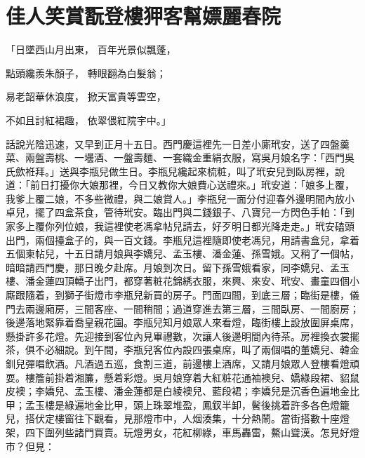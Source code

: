 %

\chapter{佳人笑賞翫登樓\KG 狎客幫嫖麗春院}

「日墜西山月出東，  百年光景似飄蓬，

點頭纔羨朱顏子，  轉眼翻為白髮翁；

易老韶華休浪度，  掀天富貴等雲空，

不如且討紅裙趣，  依翠偎紅院宇中。」

話說光陰迅速，又早到正月十五日。西門慶這裡先一日差小廝玳安，送了四盤羹菜、兩盤壽桃、一壜酒、一盤壽麵、一套織金重絹衣服，寫吳月娘名字：「西門吳氏歛袵拜。」送與李瓶兒做生日。李瓶兒纔起來梳粧，叫了玳安兒到臥房裡，說道：「前日打擾你大娘那裡，今日又教你大娘費心送禮來。」玳安道：「娘多上覆，我爹上覆二娘，不多些微禮，與二娘賞人。」李瓶兒一面分付迎春外邊明間內放小卓兒，擺了四盒茶食，管待玳安。臨出門與二錢銀子、八寶兒一方閃色手帕：「到家多上覆你列位娘，我這裡使老馮拿帖兒請去，好歹明日都光降走走。」玳安磕頭出門，兩個擡盒子的，與一百文錢。李瓶兒這裡隨即使老馮兒，用請書盒兒，拿着五個柬帖兒，十五日請月娘與李嬌兒、孟玉樓、潘金蓮、孫雪娥。又稍了一個帖，暗暗請西門慶，那日晚夕赴席。月娘到次日。留下孫雪娥看家，同李嬌兒、孟玉樓、潘金蓮四頂轎子出門，都穿著粧花錦綉衣服，來興、來安、玳安、畫童四個小廝跟隨着，到獅子街燈巿李瓶兒新買的房子。門面四間，到底三層；臨街是樓，儀門去兩邊廂房，三間客座、一間稍間；過道穿進去第三層，三間臥房、一間廚房；後邊落地緊靠着喬皇親花園。李瓶兒知月娘眾人來看燈，臨街樓上設放圍屏桌席，懸掛許多花燈。先迎接到客位內見畢禮數，次讓人後邊明間內待茶。房裡換衣裳擺茶，俱不必細說。到午間，李瓶兒客位內設四張桌席，叫了兩個唱的董嬌兒、韓金釧兒彈唱飲酒。凡酒過五巡，食割三道，前邊樓上酒席，又請月娘眾人登樓看燈頑耍。樓簷前掛着湘簾，懸着彩燈。吳月娘穿着大紅粧花通袖襖兒、嬌綠段裙、貂鼠皮襖；李嬌兒、孟玉樓、潘金蓮都是白綾襖兒、藍段裙；李嬌兒是沉香色遍地金比甲；孟玉樓是綠遍地金比甲，頭上珠翠堆盈，鳳釵半卸，鬢後挑着許多各色燈籠兒，搭伏定樓窗往下觀看，見那燈巿中，人烟湊集，十分熱鬧。當街搭數十座燈架，四下圍列些諸門買賣。玩燈男女，花紅柳綠，車馬轟雷，鰲山聳漢。怎見好燈巿？但見：

